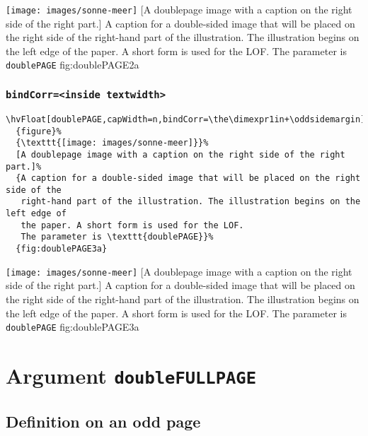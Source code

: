 \documentclass[twoside]{scrartcl}
\makeatletter
\let\hvBlindtext\Blindtext
\def\Blindtext{\par\color{black!40}\hvBlindtext\par\normalcolor}
\def\hvblindtext{\textcolor{black!40}{\blindtext@text}}
\makeatother
\begin{document}
%
  {\texttt{[image: images/sonne-meer]}}%
  [A doublepage image with a caption on the right side of the right part.]%
  {A caption for a double-sided image that will be placed on the right side of the
   right-hand part of the illustration. The illustration begins on the left edge of 
   the paper. A short form is used for the LOF. 
   The parameter is \texttt{doublePAGE}}%
  {fig:doublePAGE2a}



\Blindtext

\Blindtext

\hvblindtext
\subsubsection{\texttt{bindCorr=<inside textwidth>}}

\begin{lstlisting}
\hvFloat[doublePAGE,capWidth=n,bindCorr=\the\dimexpr1in+\oddsidemargin]%
  {figure}%
  {\texttt{[image: images/sonne-meer]}}%
  [A doublepage image with a caption on the right side of the right part.]%
  {A caption for a double-sided image that will be placed on the right side of the
   right-hand part of the illustration. The illustration begins on the left edge of 
   the paper. A short form is used for the LOF. 
   The parameter is \texttt{doublePAGE}}%
  {fig:doublePAGE3a}
\end{lstlisting}

%
  {\texttt{[image: images/sonne-meer]}}%
  [A doublepage image with a caption on the right side of the right part.]%
  {A caption for a double-sided image that will be placed on the right side of the
   right-hand part of the illustration. The illustration begins on the left edge of 
   the paper. A short form is used for the LOF. 
   The parameter is \texttt{doublePAGE}}%
  {fig:doublePAGE3a}


\Blindtext

\Blindtext


\clearpage

\section{Argument \texttt{doubleFULLPAGE}}
\subsection{Definition on an odd page}
\end{document}
